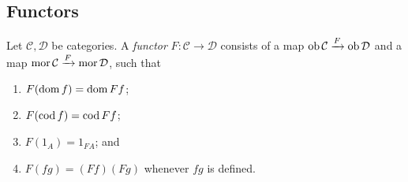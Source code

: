\subsection{Functors}
\begin{definition}
    Let \( \mathcal C, \mathcal D \) be categories.
    A \emph{functor} \( F : \mathcal C \to \mathcal D \) consists of a map \( \operatorname{ob} \mathcal C \xrightarrow F \operatorname{ob} \mathcal D \) and a map \( \operatorname{mor} \mathcal C \xrightarrow F \operatorname{mor} \mathcal D \), such that
    \begin{enumerate}
        \item \( F(\operatorname{dom} f) = \operatorname{dom} Ff \);
        \item \( F(\operatorname{cod} f) = \operatorname{cod} Ff \);
        \item \( F(1_A) = 1_{F A} \); and
        \item \( F(fg) = (Ff)(Fg) \) whenever \( fg \) is defined.
    \end{enumerate}
\end{definition}

